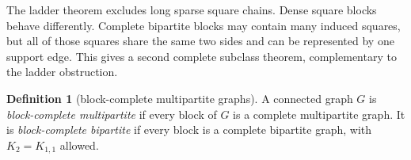 \documentclass[11pt]{article}
\theoremstyle{definition}
\newtheorem{definition}[theorem]{Definition}
\newcommand{\dist}{\operatorname{dist}}
\begin{document}
The ladder theorem excludes long sparse square chains.  Dense square blocks behave differently.  Complete bipartite blocks may contain many induced squares, but all of those squares share the same two sides and can be represented by one support edge.  This gives a second complete subclass theorem, complementary to the ladder obstruction.

\begin{definition}[block-complete multipartite graphs]
A connected graph $G$ is \emph{block-complete multipartite} if every block of $G$ is a complete multipartite graph.  It is \emph{block-complete bipartite} if every block is a complete bipartite graph, with $K_2=K_{1,1}$ allowed.
\end{definition}


\begin{figure}[H]
\centering
{}
\end{figure}
\end{document}
